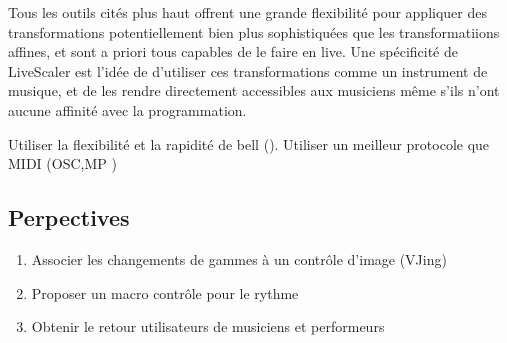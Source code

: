 Tous les outils cités plus haut offrent une grande flexibilité pour appliquer des transformations potentiellement bien plus sophistiquées que les transformatiions affines, et sont a priori tous capables de le faire en live. Une spécificité de LiveScaler est l'idée de d'utiliser ces transformations comme un instrument de musique, et de les rendre directement accessibles aux musiciens même s'ils n'ont aucune affinité avec la programmation.

Utiliser la flexibilité et la rapidité de bell (\cite{agostini2020programmer}). Utiliser un meilleur protocole que MIDI (OSC,MP \cite{goudard2017mapping})
\subsection{Perpectives}
\begin{enumerate}
  \item Associer les changements de gammes à un contrôle d'image (VJing)
  \item Proposer un macro contrôle pour le rythme
  \item Obtenir le retour utilisateurs de musiciens et performeurs
\end{enumerate}